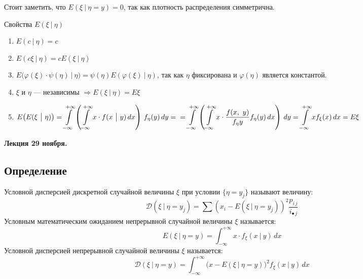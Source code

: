 \documentclass[12pt, a4paper]{article}
\begin{document}
    Стоит заметить, что $E(\xi\ \big|\ \eta = y) = 0$, так как плотность распределения симметрична.
    \begin{center}
        Свойства $E(\xi\ \big|\ \eta)$
    \end{center}
    \begin{enumerate}
        \item $E(c\ \big|\ \eta) = c$
        \item $E(c\xi\ \big|\ \eta) = cE(\xi\ \big|\ \eta)$
        \item $E\big(\varphi(\xi)\cdot \psi(\eta)\ \big|\ \eta\big) = \psi(\eta)E(\varphi(\xi)\ \big|\ \eta)$, так как $\eta$ фиксирована и $\varphi(\eta)$ является константой.
        \item $\xi$ и $\eta$ --- независимы $\Rightarrow E(\xi\ \big|\ \eta) = E\xi$
        \item $\displaystyle E\big(E(\xi\ \big|\ \eta)\big) = \int\limits_{-\infty}^{+\infty}\left(\int\limits_{-\infty}^{+\infty} x\cdot f(x\ \big|\ y)\, dx\right)\, f_{\eta}(y)\, dy =\\
        =  \int\limits_{-\infty}^{+\infty}\left(\int\limits_{-\infty}^{+\infty} x\cdot \frac{f(x,\ y)}{f_{\eta}{y}} f_{\eta}(y)\, dx\right)\, dy = \int\limits_{-\infty}^{+\infty} x f_{\xi}(x)\, dx = E\xi$ 
    \end{enumerate}
    \begin{center}
        \bf Лекция 29 ноября.
    \end{center}
    \subsection*{Определение}
    Условной дисперсией дискретной случайной величины $\xi$ при условии $\{\eta = y_j\}$ называют величину:
    \[\mathcal{D}(\xi\ |\ \eta = y_j) = \sum \left(x_i - E(\xi\ |\ \eta = y_j)\right)^2 \frac{p_{i\, j}}{i_{\bullet\, j}}\]
    Условным математическим ожиданием непрерывной случайной величины $\xi$ называется:
    \[E(\xi\ |\ \eta = y) = \int_{-\infty}^{+\infty} x\cdot f_{\xi}(x\ |\ y)\, dx\]
    Условной дисперсией непрерывной случайной величины $\xi$ называется:
    \[\mathcal{D}(\xi\ |\ \eta = y) = \int_{-\infty}^{+\infty} \big(x - E(\xi\ |\ \eta = y)\big)^2 f_{\xi}(x\ |\ y)\, dx\]
\end{document}
